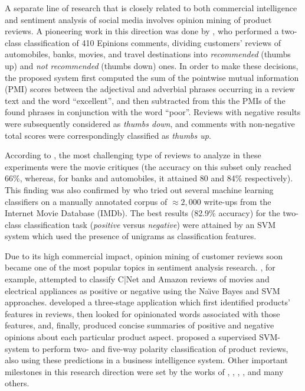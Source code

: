 A separate line of research that is closely related to both commercial
intelligence and sentiment analysis of social media involves opinion
mining of product reviews.  A pioneering work in this direction was
done by \citet{Turney:02}, who performed a two-class classification of
410 Epinions comments, dividing customers' reviews of automobiles,
banks, movies, and travel destinations into \emph{recommended} (thumbs
up) and \emph{not recommended} (thumbs down) ones.  In order to make
these decisions, the proposed system first computed the sum of the
pointwise mutual information (PMI) scores between the adjectival and
adverbial phrases occurring in a review text and the word
``excellent'', and then subtracted from this the PMIs of the found
phrases in conjunction with the word ``poor''.  Reviews with negative
results were subsequently considered as \emph{thumbs down}, and
comments with non-negative total scores were correspondingly
classified as \emph{thumbs up}.

According to \citet{Turney:02}, the most challenging type of reviews
to analyze in these experiments were the movie critiques (the accuracy
on this subset only reached 66\%, whereas, for banks and automobiles,
it attained 80 and 84\% respectively).  This finding was also
confirmed by \citet{Pang:02} who tried out several machine learning
classifiers on a manually annotated corpus of $\approx2,000$ write-ups
from the Internet Movie Database (IMDb).  The best results (82.9\%
accuracy) for the two-class classification task (\emph{positive}
versus \emph{negative}) were attained by an SVM system which used the
presence of unigrams as classification features.

Due to its high commercial impact, opinion mining of customer reviews
soon became one of the most popular topics in sentiment analysis
research.  \citet{Dave:03}, for example, attempted to classify C|Net
and Amazon reviews of movies and electrical appliances as positive or
negative using the Na\"{\i}ve Bayes and SVM approaches.  \citet{Hu:04}
developed a three-stage application which first identified products'
features in reviews, then looked for opinionated words associated with
those features, and, finally, produced concise summaries of positive
and negative opinions about each particular product aspect.
\citet{Funk:08} proposed a supervised SVM-system to perform two- and
five-way polarity classification of product reviews, also using these
predictions in a business intelligence system.  Other important
milestones in this research direction were set by the works of
\citet{Popescu:05}, \citet{Ding:09}, \citet{Wei:10},
\citet{Mukherjee:12}, and many others.

